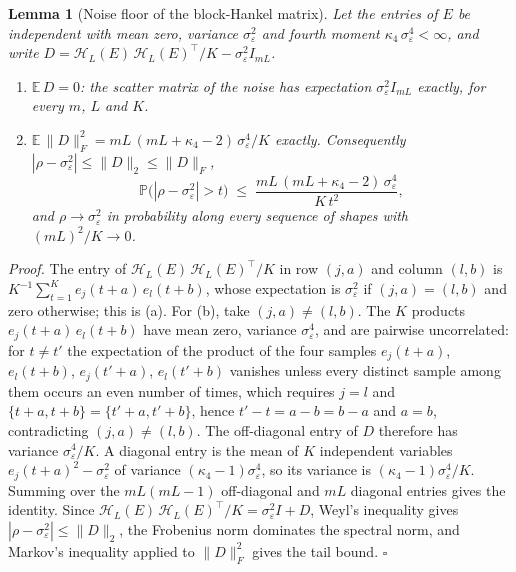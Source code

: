 \documentclass{article}
\newtheorem{lemma}{\bf Lemma}
\begin{document}
\begin{lemma}[Noise floor of the block-Hankel matrix] \label{lem:floor}
Let the entries of $E$ be independent with mean zero, variance $\sigma_\varepsilon^{2}$ and fourth moment $\kappa_4\,\sigma_\varepsilon^{4} < \infty$, and write $D = \mathcal{H}_L(E)\,\mathcal{H}_L(E)^{\top}/K - \sigma_\varepsilon^{2} I_{mL}$.
\begin{enumerate}
\renewcommand{\labelenumi}{(\alph{enumi})}
\item $\mathbb{E}\,D = 0$: the scatter matrix of the noise has expectation $\sigma_\varepsilon^{2} I_{mL}$ exactly, for every $m$, $L$ and $K$.
\item $\mathbb{E}\,\lVert D \rVert_F^{2} = mL\,(mL + \kappa_4 - 2)\,\sigma_\varepsilon^{4}/K$ exactly. Consequently $|\rho - \sigma_\varepsilon^{2}| \le \lVert D \rVert_2 \le \lVert D \rVert_F$,
\[
\mathbb{P}\bigl(|\rho - \sigma_\varepsilon^{2}| > t\bigr) \;\le\; \frac{mL\,(mL + \kappa_4 - 2)\,\sigma_\varepsilon^{4}}{K\,t^{2}} ,
\]
and $\rho \to \sigma_\varepsilon^{2}$ in probability along every sequence of shapes with $(mL)^{2}/K \to 0$.
\end{enumerate}
\end{lemma}

\textit{Proof.} The entry of $\mathcal{H}_L(E)\,\mathcal{H}_L(E)^{\top}/K$ in row $(j, a)$ and column $(l, b)$ is $K^{-1} \sum_{t=1}^{K} e_j(t+a)\, e_l(t+b)$, whose expectation is $\sigma_\varepsilon^{2}$ if $(j, a) = (l, b)$ and zero otherwise; this is (a). For (b), take $(j, a) \ne (l, b)$. The $K$ products $e_j(t+a)\,e_l(t+b)$ have mean zero, variance $\sigma_\varepsilon^{4}$, and are pairwise uncorrelated: for $t \ne t'$ the expectation of the product of the four samples $e_j(t+a)$, $e_l(t+b)$, $e_j(t'+a)$, $e_l(t'+b)$ vanishes unless every distinct sample among them occurs an even number of times, which requires $j = l$ and $\{t + a, t + b\} = \{t' + a, t' + b\}$, hence $t' - t = a - b = b - a$ and $a = b$, contradicting $(j, a) \ne (l, b)$. The off-diagonal entry of $D$ therefore has variance $\sigma_\varepsilon^{4}/K$. A diagonal entry is the mean of $K$ independent variables $e_j(t+a)^{2} - \sigma_\varepsilon^{2}$ of variance $(\kappa_4 - 1)\sigma_\varepsilon^{4}$, so its variance is $(\kappa_4 - 1)\sigma_\varepsilon^{4}/K$. Summing over the $mL(mL - 1)$ off-diagonal and $mL$ diagonal entries gives the identity. Since $\mathcal{H}_L(E)\,\mathcal{H}_L(E)^{\top}/K = \sigma_\varepsilon^{2} I + D$, Weyl's inequality gives $|\rho - \sigma_\varepsilon^{2}| \le \lVert D \rVert_2$, the Frobenius norm dominates the spectral norm, and Markov's inequality applied to $\lVert D \rVert_F^{2}$ gives the tail bound. $\square$
\end{document}
